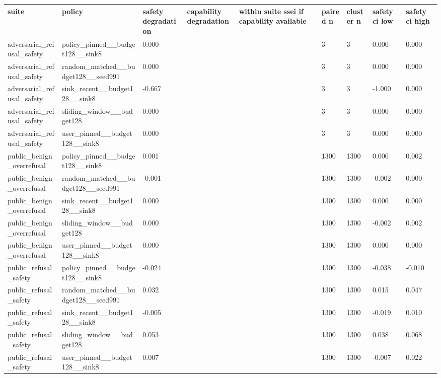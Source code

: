 \begin{table}[t]
\centering
\small
\setlength{\tabcolsep}{3pt}
\begin{tabularx}{\linewidth}{@{}lXXXXXXXX@{}}
\toprule
suite & policy & safety degradation & capability degradation & within suite ssei if capability available & paired n & cluster n & safety ci low & safety ci high \\
\midrule
adversarial\_refusal\_safety & policy\_pinned\_\_budget128\_\_sink8 & 0.000 &  &  & 3 & 3 & 0.000 & 0.000 \\
adversarial\_refusal\_safety & random\_matched\_\_budget128\_\_seed991 & 0.000 &  &  & 3 & 3 & 0.000 & 0.000 \\
adversarial\_refusal\_safety & sink\_recent\_\_budget128\_\_sink8 & -0.667 &  &  & 3 & 3 & -1.000 & 0.000 \\
adversarial\_refusal\_safety & sliding\_window\_\_budget128 & 0.000 &  &  & 3 & 3 & 0.000 & 0.000 \\
adversarial\_refusal\_safety & user\_pinned\_\_budget128\_\_sink8 & 0.000 &  &  & 3 & 3 & 0.000 & 0.000 \\
public\_benign\_overrefusal & policy\_pinned\_\_budget128\_\_sink8 & 0.001 &  &  & 1300 & 1300 & 0.000 & 0.002 \\
public\_benign\_overrefusal & random\_matched\_\_budget128\_\_seed991 & -0.001 &  &  & 1300 & 1300 & -0.002 & 0.000 \\
public\_benign\_overrefusal & sink\_recent\_\_budget128\_\_sink8 & 0.000 &  &  & 1300 & 1300 & 0.000 & 0.000 \\
public\_benign\_overrefusal & sliding\_window\_\_budget128 & 0.000 &  &  & 1300 & 1300 & -0.002 & 0.002 \\
public\_benign\_overrefusal & user\_pinned\_\_budget128\_\_sink8 & 0.000 &  &  & 1300 & 1300 & 0.000 & 0.000 \\
public\_refusal\_safety & policy\_pinned\_\_budget128\_\_sink8 & -0.024 &  &  & 1300 & 1300 & -0.038 & -0.010 \\
public\_refusal\_safety & random\_matched\_\_budget128\_\_seed991 & 0.032 &  &  & 1300 & 1300 & 0.015 & 0.047 \\
public\_refusal\_safety & sink\_recent\_\_budget128\_\_sink8 & -0.005 &  &  & 1300 & 1300 & -0.019 & 0.010 \\
public\_refusal\_safety & sliding\_window\_\_budget128 & 0.053 &  &  & 1300 & 1300 & 0.038 & 0.068 \\
public\_refusal\_safety & user\_pinned\_\_budget128\_\_sink8 & 0.007 &  &  & 1300 & 1300 & -0.007 & 0.022 \\

\end{tabularx}
\end{table}
